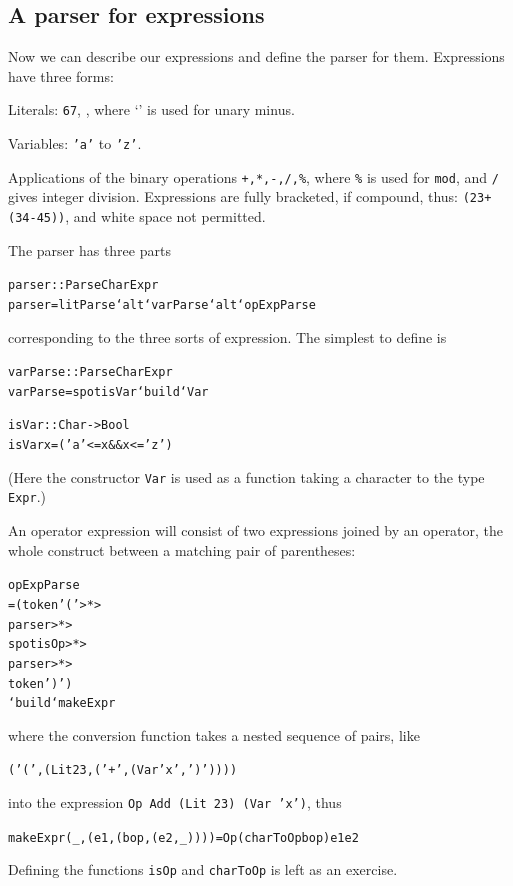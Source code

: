 \subsection*{A parser for expressions}

Now we can describe our expressions and define the parser for them.
Expressions have three forms:
\begin{titemize}%
\item Literals: \texttt{67}, \texttt{}, where `\texttt{\twid}' is used for
unary minus.
\item Variables:        \texttt{'a'} to \texttt{'z'}.
\item Applications of the binary operations \texttt{+,*,-,/,\%}, where \texttt{\%}
is used for \texttt{mod}, and \texttt{/} gives integer division. Expressions are
fully bracketed, if compound, thus: \texttt{(23+(34-45))}, and white
space not permitted.
\end{titemize}
The parser has three parts
\begin{alltt}
parser :: Parse Char Expr
parser = litParse `alt` varParse `alt` opExpParse
\end{alltt}
corresponding to the three sorts of expression. The simplest to define is
\begin{alltt}
varParse :: Parse Char Expr
varParse = spot isVar `build` Var

isVar :: Char -> Bool
isVar x = ('a' <= x \&\& x <= 'z')
\end{alltt}
(Here the constructor \texttt{Var} is used as a function taking a character to
the type \texttt{Expr}.)

An operator expression will consist of two expressions joined by an operator,
the whole construct between a matching pair of parentheses:
\label{opExpParse}\begin{alltt}
opExpParse 
  = (token '(' >*>
     parser    >*>
     spot isOp >*>
     parser    >*>
     token ')') 
     `build` makeExpr
\end{alltt}
where the conversion function takes a nested sequence of pairs, like

\begin{alltt}
('(',(Lit 23,('+',(Var 'x',')'))))
\end{alltt}
into the expression \texttt{Op Add (Lit 23) (Var 'x')}, thus
\begin{alltt}
makeExpr (_,(e1,(bop,(e2,_)))) = Op (charToOp bop) e1 e2
\end{alltt}
Defining the functions \texttt{isOp} and \texttt{charToOp} is left as an
exercise. 

